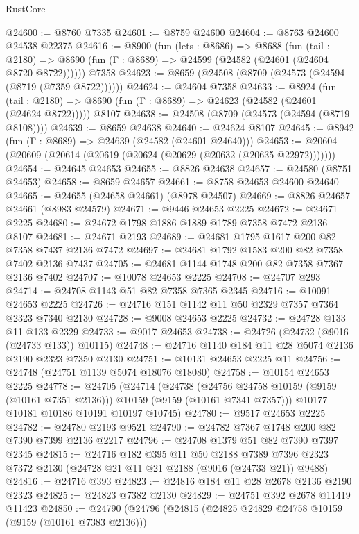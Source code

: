 \begin{lexlean}{RustCore}
\begin{coremodule}
@24600 := @8760 @7335
@24601 := @8759 @24600
@24604 := @8763 @24600 @24538 @22375
@24616 := @8900
    (fun (lets : @8686) =>
    @8688
      (fun (tail : @2180) =>
      @8690 (fun (Γ : @8689) => @24599 (@24582 (@24601 (@24604 @8720 @8722))))))
    @7358
@24623 := @8659 (@24508 (@8709 (@24573 (@24594 (@8719 (@7359 @8722))))))
@24624 := @24604 @7358
@24633 := @8924
    (fun (tail : @2180) => @8690 (fun (Γ : @8689) => @24623 (@24582 (@24601 (@24624 @8722)))))
    @8107
@24638 := @24508 (@8709 (@24573 (@24594 (@8719 @8108))))
@24639 := @8659 @24638
@24640 := @24624 @8107
@24645 := @8942 (fun (Γ : @8689) => @24639 (@24582 (@24601 @24640)))
@24653 := @20604 (@20609 (@20614 (@20619 (@20624 (@20629 (@20632 (@20635 @22972)))))))
@24654 := @24645 @24653
@24655 := @8826 @24638
@24657 := @24580 (@8751 @24653)
@24658 := @8659 @24657
@24661 := @8758 @24653 @24600 @24640
@24665 := @24655 (@24658 @24661) (@8978 @24507)
@24669 := @8826 @24657 @24661 (@8983 @24579)
@24671 := @9446 @24653 @2225
@24672 := @24671 @2225
@24680 := @24672 @1798 @1886 @1889 @1789 @7358 @7472 @2136 @8107
@24681 := @24671 @2193
@24689 := @24681 @1795 @1617 @200 @82 @7358 @7437 @2136 @7472
@24697 := @24681 @1792 @1583 @200 @82 @7358 @7402 @2136 @7437
@24705 := @24681 @1144 @1748 @200 @82 @7358 @7367 @2136 @7402
@24707 := @10078 @24653 @2225
@24708 := @24707 @293
@24714 := @24708 @1143 @51 @82 @7358 @7365 @2345
@24716 := @10091 @24653 @2225
@24726 := @24716 @151 @1142 @11 @50 @2329 @7357 @7364 @2323 @7340 @2130
@24728 := @9008 @24653 @2225
@24732 := @24728 @133 @11 @133 @2329
@24733 := @9017 @24653
@24738 := @24726 (@24732 (@9016 (@24733 @133)) @10115)
@24748 := @24716 @1140 @184 @11 @28 @5074 @2136 @2190 @2323 @7350 @2130
@24751 := @10131 @24653 @2225 @11
@24756 := @24748 (@24751 @1139 @5074 @18076 @18080)
@24758 := @10154 @24653 @2225
@24778 := @24705
    (@24714
      (@24738
        (@24756 @24758 @10159 (@9159 (@10161 @7351 @2136)))
        @10159
        (@9159 (@10161 @7341 @7357)))
      @10177
      @10181
      @10186
      @10191
      @10197
      @10745)
@24780 := @9517 @24653 @2225
@24782 := @24780 @2193 @9521
@24790 := @24782 @7367 @1748 @200 @82 @7390 @7399 @2136 @2217
@24796 := @24708 @1379 @51 @82 @7390 @7397 @2345
@24815 := @24716
    @182
    @395
    @11
    @50
    @2188
    @7389
    @7396
    @2323
    @7372
    @2130
    (@24728 @21 @11 @21 @2188 (@9016 (@24733 @21)) @9488)
@24816 := @24716 @393
@24823 := @24816 @184 @11 @28 @2678 @2136 @2190 @2323
@24825 := @24823 @7382 @2130
@24829 := @24751 @392 @2678 @11419 @11423
@24850 := @24790
    (@24796
      (@24815
        (@24825 @24829 @24758 @10159 (@9159 (@10161 @7383 @2136)))

\end{coremodule}
\end{lexlean}
